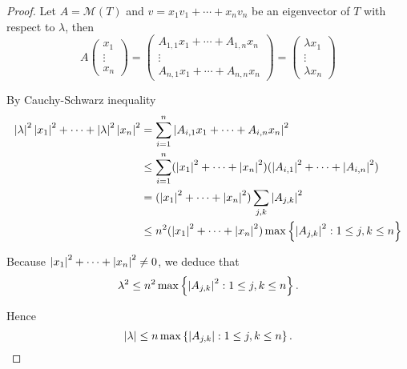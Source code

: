 \begin{proof}
    Let $A = \mathcal{M}(T)$ and $v = x_{1}v_{1} + \cdots + x_{n}v_{n}$ be an eigenvector of $T$ with respect to $\lambda$, then
    \[
        A\begin{pmatrix}x_{1} \\ \vdots \\ x_{n}\end{pmatrix} = \begin{pmatrix}
            A_{1,1}x_{1} + \cdots + A_{1,n}x_{n} \\
            \vdots                               \\
            A_{n,1}x_{1} + \cdots + A_{n,n}x_{n}
        \end{pmatrix} = \begin{pmatrix}
            \lambda x_{1} \\ \vdots \\ \lambda x_{n}
        \end{pmatrix}
    \]

    By Cauchy-Schwarz inequality
    \begin{align*}
        \left\vert{\lambda}\right\vert^{2}\left\vert{x_{1}}\right\vert^{2} + \cdots + \left\vert{\lambda}\right\vert^{2}\left\vert{x_{n}}\right\vert^{2} & = \sum^{n}_{i=1}{\left\vert{A_{i,1}x_{1} + \cdots + A_{i,n}x_{n}}\right\vert}^{2}                                                \\
                                                                                     & \leq \sum^{n}_{i=1}(\left\vert{x_{1}}\right\vert^{2} + \cdots + \left\vert{x_{n}}\right\vert^{2})(\left\vert{A_{i,1}}\right\vert^{2} + \cdots + \left\vert{A_{i,n}}\right\vert^{2}) \\
                                                                                     & = (\left\vert{x_{1}}\right\vert^{2} + \cdots + \left\vert{x_{n}}\right\vert^{2})\sum_{j,k}\left\vert{A_{j,k}}\right\vert^{2}                                       \\
                                                                                     & \leq n^{2}(\left\vert{x_{1}}\right\vert^{2} + \cdots + \left\vert{x_{n}}\right\vert^{2})\max\left\{\left\vert{A_{j,k}}\right\vert^{2}: 1\leq j, k\leq n\right\}
    \end{align*}

    Because $\left\vert{x_{1}}\right\vert^{2} + \cdots + \left\vert{x_{n}}\right\vert^{2}\ne 0$, we deduce that
    \[
        \lambda^{2}\leq n^{2}\max\left\{\left\vert{A_{j,k}}\right\vert^{2}: 1\leq j, k\leq n\right\}.
    \]

    Hence
    \[
        \left\vert{\lambda}\right\vert\leq n\max\left\{\left\vert{A_{j,k}}\right\vert: 1\leq j, k\leq n\right\}.\qedhere
    \]
\end{proof}
\newpage

